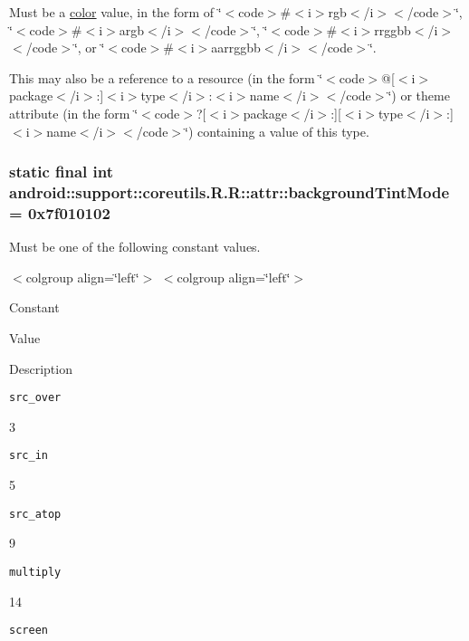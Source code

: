 Must be a \hyperlink{classandroid_1_1support_1_1coreutils_1_1_r_1_1color}{color} value, in the form of \char`\"{}$<$code$>$\#$<$i$>$rgb$<$/i$>$$<$/code$>$\char`\"{}, \char`\"{}$<$code$>$\#$<$i$>$argb$<$/i$>$$<$/code$>$\char`\"{}, \char`\"{}$<$code$>$\#$<$i$>$rrggbb$<$/i$>$$<$/code$>$\char`\"{}, or \char`\"{}$<$code$>$\#$<$i$>$aarrggbb$<$/i$>$$<$/code$>$\char`\"{}. 

This may also be a reference to a resource (in the form \char`\"{}$<$code$>$@\mbox{[}$<$i$>$package$<$/i$>$:\mbox{]}$<$i$>$type$<$/i$>$:$<$i$>$name$<$/i$>$$<$/code$>$\char`\"{}) or theme attribute (in the form \char`\"{}$<$code$>$?\mbox{[}$<$i$>$package$<$/i$>$:\mbox{]}\mbox{[}$<$i$>$type$<$/i$>$:\mbox{]}$<$i$>$name$<$/i$>$$<$/code$>$\char`\"{}) containing a value of this type. \hypertarget{classandroid_1_1support_1_1coreutils_1_1_r_1_1attr_54dc800222c114abb07ff964249dbf46}{
\subsubsection[{backgroundTintMode}]{\setlength{\rightskip}{0pt plus 5cm}static final int android::support::coreutils.R.R::attr::backgroundTintMode = 0x7f010102}}
\label{classandroid_1_1support_1_1coreutils_1_1_r_1_1attr_54dc800222c114abb07ff964249dbf46}


Must be one of the following constant values. \begin{TabularC}{0}
\hline
\end{TabularC}
$<$colgroup align=\char`\"{}left\char`\"{}$>$ $<$colgroup align=\char`\"{}left\char`\"{}$>$ 

Constant

Value

Description 

{\tt src\_\-over}

3

{\tt src\_\-in}

5

{\tt src\_\-atop}

9

{\tt multiply}

14

{\tt screen}

